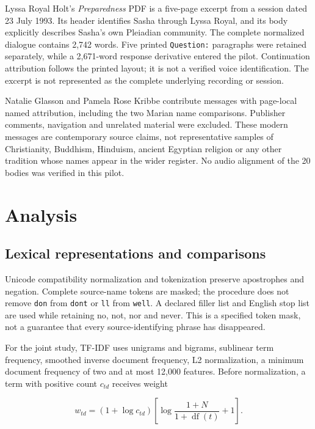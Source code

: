 \documentclass[
  11pt,
]{article}
\begin{document}
Lyssa Royal Holt's \emph{Preparedness} PDF is a five-page excerpt from a
session dated 23 July 1993. Its header identifies Sasha through Lyssa
Royal, and its body explicitly describes Sasha's own Pleiadian
community. The complete normalized dialogue contains 2,742 words. Five
printed \texttt{Question:} paragraphs were retained separately, while a
2,671-word response derivative entered the pilot. Continuation
attribution follows the printed layout; it is not a verified voice
identification. The excerpt is not represented as the complete
underlying recording or session.

Natalie Glasson and Pamela Rose Kribbe contribute messages with
page-local named attribution, including the two Marian name comparisons.
Publisher comments, navigation and unrelated material were excluded.
These modern messages are contemporary source claims, not representative
samples of Christianity, Buddhism, Hinduism, ancient Egyptian religion
or any other tradition whose names appear in the wider register. No
audio alignment of the 20 bodies was verified in this pilot.

\FloatBarrier

\section{Analysis}\label{analysis}

\FloatBarrier

\subsection{Lexical representations and
comparisons}\label{lexical-representations-and-comparisons}

Unicode compatibility normalization and tokenization preserve
apostrophes and negation. Complete source-name tokens are masked; the
procedure does not remove \texttt{don} from
\texttt{don\textquotesingle{}t} or \texttt{ll} from
\texttt{we\textquotesingle{}ll}. A declared filler list and English stop
list are used while retaining no, not, nor and never. This is a
specified token mask, not a guarantee that every source-identifying
phrase has disappeared.

For the joint study, TF-IDF uses unigrams and bigrams, sublinear term
frequency, smoothed inverse document frequency, L2 normalization, a
minimum document frequency of two and at most 12,000 features. Before
normalization, a term with positive count \(c_{td}\) receives weight

\[w_{td}=(1+\log c_{td})\left[\log\frac{1+N}{1+\operatorname{df}(t)}+1\right].\]
\end{document}
